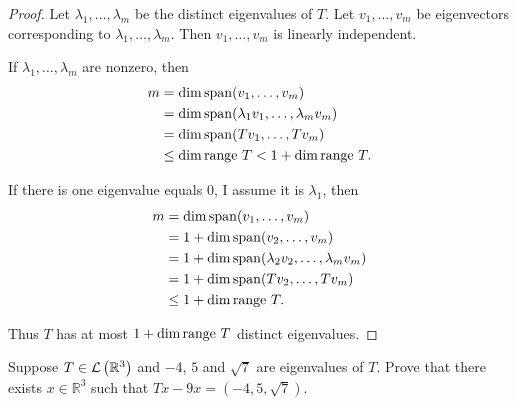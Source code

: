 \begin{proof}
    Let $\lambda_{1}, \ldots, \lambda_{m}$ be the distinct eigenvalues of $T$. Let $v_{1}, \ldots, v_{m}$ be eigenvectors corresponding to $\lambda_{1}, \ldots, \lambda_{m}$. Then $v_{1}, \ldots, v_{m}$ is linearly independent.

    If $\lambda_{1}, \ldots, \lambda_{m}$ are nonzero, then
    \begin{align*}
        m & = \dim\operatorname{span}(v_{1}, \ldots, v_{m})                       \\
          & = \dim\operatorname{span}(\lambda_{1}v_{1}, \ldots, \lambda_{m}v_{m}) \\
          & = \dim\operatorname{span}(Tv_{1}, \ldots, Tv_{m})                     \\
          & \leq \dim\operatorname{range}\,{T} < 1 + \dim\operatorname{range}\,{T}.
    \end{align*}

    If there is one eigenvalue equals $0$, I assume it is $\lambda_{1}$, then
    \begin{align*}
        m & = \dim\operatorname{span}(v_{1}, \ldots, v_{m})                           \\
          & = 1 + \dim\operatorname{span}(v_{2}, \ldots, v_{m})                       \\
          & = 1 + \dim\operatorname{span}(\lambda_{2}v_{2}, \ldots, \lambda_{m}v_{m}) \\
          & = 1 + \dim\operatorname{span}(Tv_{2}, \ldots, Tv_{m})                     \\
          & \leq 1 + \dim\operatorname{range}\,{T}.
    \end{align*}

    Thus $T$ has at most $1 + \dim\operatorname{range}\,{T}$ distinct eigenvalues.
\end{proof}
\newpage

\begin{exercise}
    Suppose $T\in\mathcal{L}\left({\mathbb{R}^{3}}\right)$ and $-4$, $5$ and $\sqrt{7}$ are eigenvalues of $T$. Prove that there exists $x\in\mathbb{R}^{3}$ such that $Tx - 9x = (-4, 5, \sqrt{7})$.
\end{exercise}

